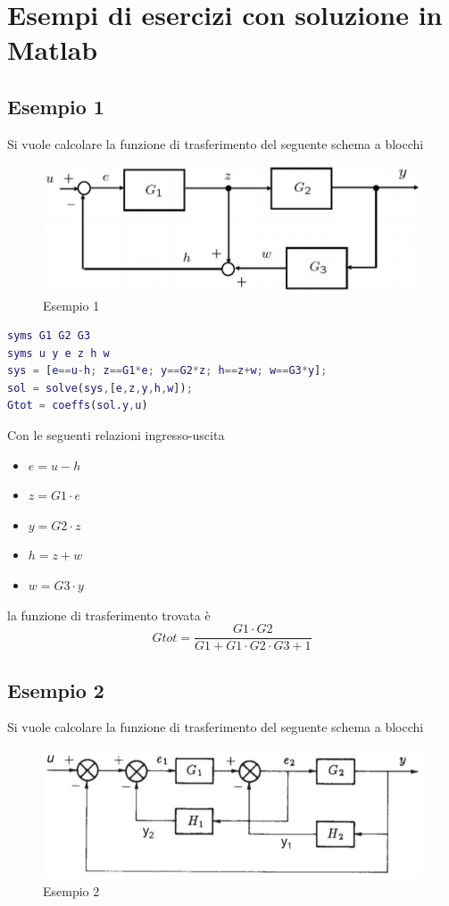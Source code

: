 \documentclass[a4paper,oneside,titlepage]{book}
\begin{document}
\section{Esempi di esercizi con soluzione in Matlab}
\subsection{Esempio 1}
Si vuole calcolare la funzione di trasferimento del seguente schema a blocchi
\begin{figure}[htp]
    \centering
    \includegraphics[scale=.5]{blocchi1.PNG}
    \caption{Esempio 1}
    \label{fig:blocchi1}
\end{figure}

\begin{lstlisting}[language=Matlab, caption=Esempio 1 in Matlab]
syms G1 G2 G3
syms u y e z h w
sys = [e==u-h; z==G1*e; y==G2*z; h==z+w; w==G3*y];
sol = solve(sys,[e,z,y,h,w]);
Gtot = coeffs(sol.y,u)
\end{lstlisting}
Con le seguenti relazioni ingresso-uscita
\begin{itemize}
\item $e = u-h$
\item $z = G1 \cdot e$
\item $y = G2 \cdot z$
\item $h = z + w$
\item $w = G3 \cdot y$
\end{itemize}
la funzione di trasferimento trovata è
\[ Gtot = \frac{G1 \cdot G2}{G1 + G1 \cdot G2 \cdot G3 + 1} \]

\subsection{Esempio 2}
Si vuole calcolare la funzione di trasferimento del seguente schema a blocchi
\begin{figure}[htp]
    \centering
    \includegraphics[scale=.5]{blocchi2.PNG}
    \caption{Esempio 2}
    \label{fig:blocchi2}
\end{figure}
\end{document}
